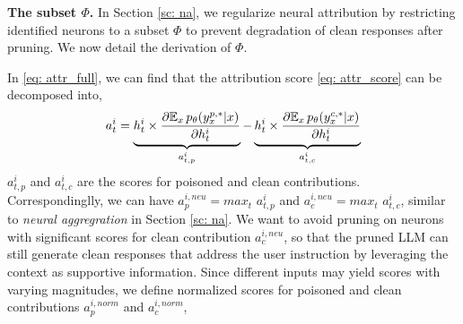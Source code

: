 



\vspace{2mm}
\noindent\textbf{The subset $\Phi$.} 
In Section \ref{sc: na}, we regularize neural attribution by restricting identified neurons to a subset $\Phi$ to prevent degradation of clean responses after pruning.
We now detail the derivation of $\Phi$.

In \eqref{eq: attr_full}, we can find that the attribution score \eqref{eq: attr_score} can be decomposed into,
%
\begin{equation}
    a_t^i = \underbrace{h_t^i\times \pdv{\mathbb E_{x} \,p_\theta (y_x^{p,*}|x)}{h_t^i}}_{a_{t,p}^i} - \underbrace{h_t^i\times \pdv{\mathbb E_{x} \,p_\theta (y_x^{c,*}|x)}{h_t^i}}_{a_{t,c}^i}
\end{equation}
%
$a_{t,p}^i$ and $a_{t,c}^i$ are the scores for poisoned and clean contributions.
Correspondinglly, we can have $a_{p}^{i, neu}=max_t \,\,a_{t,p}^i$ and $a_{c}^{i, neu}=max_t \,\,a_{t,c}^i$, similar to \textit{neural aggregration} in Section \ref{sc: na}.
We want to avoid pruning on neurons with significant scores for clean contribution  $a_{c}^{i, neu}$, so that the pruned LLM can still generate clean responses that address the user instruction by leveraging the context as supportive information.
Since different inputs may yield scores with varying magnitudes, we define normalized scores for poisoned and clean contributions $a_{p}^{i, norm}$ and $a_{c}^{i, norm}$,


